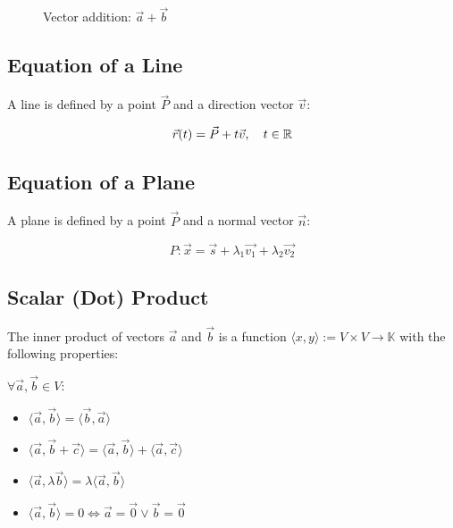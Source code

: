 \begin{figure}[h!]
	\centering
	\caption{Vector addition: \(\vec{a} + \vec{b}\)}
\end{figure}

\subsection{Equation of a Line}

A line is defined by a point \(\vec{P}\) and a direction vector \(\vec{v}\):

\[
	\vec{r}(t) = \vec{P} + t\vec{v}, \quad t \in \mathbb{R}
\]

\subsection{Equation of a Plane}

A plane is defined by a point \(\vec{P}\) and a normal vector \(\vec{n}\):

\[
	P: \vec{x} = \vec{s} + \lambda_1 \vec{v_1} + \lambda_2 \vec{v_2}
\]

\subsection{Scalar (Dot) Product}

The inner product of vectors \(\vec{a}\) and \(\vec{b}\) is a function \(\langle x, y\rangle :=V \times V \rightarrow \mathbb{K}\)
with the following properties:

\(\forall \vec{a}, \vec{b} \in V\):

\begin{itemize}
	\item \(\langle\vec{a}, \vec{b}\rangle = \langle\vec{b}, \vec{a}\rangle \)
	\item \(\langle\vec{a}, \vec{b} + \vec{c}\rangle = \langle\vec{a}, \vec{b}\rangle + \langle\vec{a}, \vec{c}\rangle\)
	\item \(\langle\vec{a}, \lambda \vec{b}\rangle = \lambda \langle\vec{a}, \vec{b}\rangle\)
	\item \(\langle\vec{a}, \vec{b}\rangle = 0 \Leftrightarrow \vec{a} = \vec{0} \vee \vec{b} = \vec{0}\)
\end{itemize}

